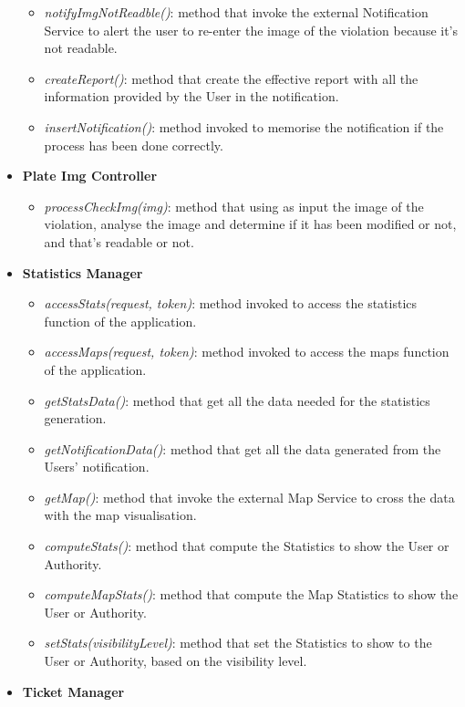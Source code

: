 \documentclass{article}
\begin{document}
\begin{itemize}
\begin{itemize}
        		\item {\it notifyImgNotReadble()}: method that invoke the external Notification Service to alert the user to re-enter the image of the violation because it's not readable.
        		\item {\it createReport()}: method that create the effective report with all the information provided by the User in the notification. 
        		\item {\it insertNotification()}: method invoked to memorise the notification if the process has been done correctly.
    		\end{itemize}
    	\item {\bf Plate Img Controller}
    		\begin{itemize}
        		\item {\it processCheckImg(img)}: method that using as input the image of the violation, analyse the image and determine if it has been modified or not, and that's readable or not.  
        	\end{itemize}
    	\item {\bf Statistics Manager}
    		\begin{itemize}
        		\item {\it accessStats(request, token)}: method invoked to access the statistics function of the application.
        		\item {\it accessMaps(request, token)}: method invoked to access the maps function of the application.
        		\item {\it getStatsData()}: method that get all the data needed for the statistics generation.
        		\item {\it getNotificationData()}: method that get all the data generated from the Users' notification.
        		\item {\it getMap()}: method that invoke the external Map Service to cross the data with the map visualisation.
        		\item {\it computeStats()}: method that compute the Statistics to show the User or Authority.
        		\item {\it computeMapStats()}: method that compute the Map Statistics to show the User or Authority.
        		\item {\it setStats(visibilityLevel)}: method that set the Statistics to show to the User or Authority, based on the visibility level. 
    		\end{itemize}
    	\item {\bf Ticket Manager}
    		\begin{itemize}

\end{itemize}
\end{itemize}
\end{document}
